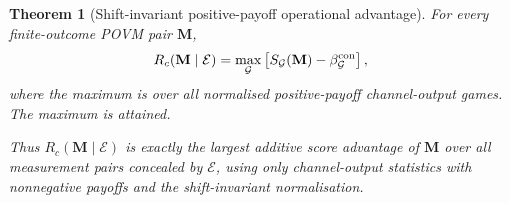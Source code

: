 \documentclass[
aps,pra,twocolumn,10pt,
superscriptaddress,longbibliography,floatfix
]{revtex4-2}
\newtheorem{theorem}{Theorem}[section]
\begin{document}
\begin{theorem}[Shift-invariant positive-payoff operational advantage]
\label{thm:shift_invariant_positive_operational_advantage}
For every finite-outcome POVM pair $\mathbf M$,
\begin{equation}
R_c(\mathbf M\mid\mathcal E)
=
\max_{\mathcal G}
\left[
S_{\mathcal G}(\mathbf M)
-
\beta_{\mathcal G}^{\rm con}
\right],
\label{eq:shift_invariant_positive_operational_advantage}
\end{equation}
where the maximum is over all normalised positive-payoff channel-output games. The maximum is attained.

Thus $R_c(\mathbf M\mid\mathcal E)$ is exactly the largest additive score advantage of $\mathbf M$ over all measurement pairs concealed by $\mathcal E$, using only channel-output statistics with nonnegative payoffs and the shift-invariant normalisation.
\end{theorem}
\end{document}
